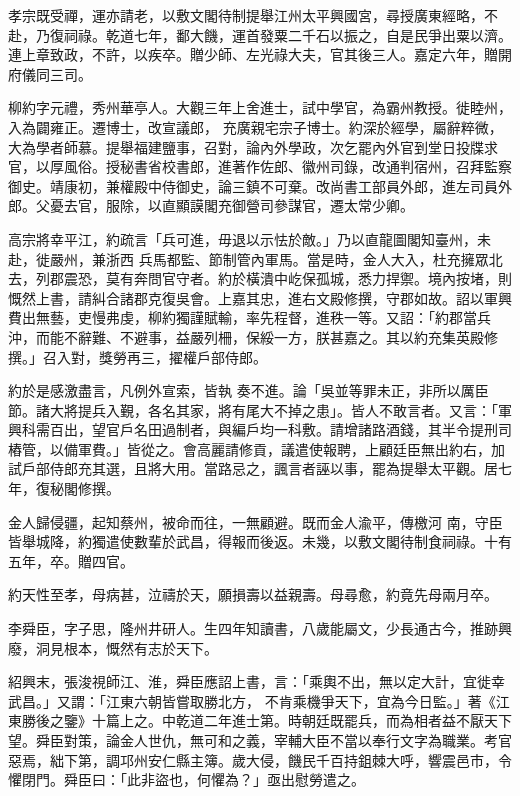 \begin{pinyinscope}
 孝宗既受禪，運亦請老，以敷文閣待制提舉江州太平興國宮，尋授廣東經略，不赴，乃復祠祿。乾道七年，鄱大饑，運首發粟二千石以振之，自是民爭出粟以濟。連上章致政，不許，以疾卒。贈少師、左光祿大夫，官其後三人。嘉定六年，贈開府儀同三司。



 柳約字元禮，秀州華亭人。大觀三年上舍進士，試中學官，為霸州教授。徙睦州，入為闢雍正。遷博士，改宣議郎，
 充廣親宅宗子博士。約深於經學，屬辭粹微，大為學者師慕。提舉福建鹽事，召對，論內外學政，次乞罷內外官到堂日投牒求官，以厚風俗。授秘書省校書郎，進著作佐郎、徽州司錄，改通判宿州，召拜監察御史。靖康初，兼權殿中侍御史，論三鎮不可棄。改尚書工部員外郎，進左司員外郎。父憂去官，服除，以直顯謨閣充御營司參謀官，遷太常少卿。



 高宗將幸平江，約疏言「兵可進，毋退以示怯於敵。」乃以直龍圖閣知臺州，未赴，徙嚴州，兼浙西
 兵馬都監、節制管內軍馬。當是時，金人大入，杜充擁眾北去，列郡震恐，莫有奔問官守者。約於橫潰中屹保孤城，悉力捍禦。境內按堵，則慨然上書，請糾合諸郡克復吳會。上嘉其忠，進右文殿修撰，守郡如故。詔以軍興費出無藝，吏慢弗虔，柳約獨謹賦輸，率先程督，進秩一等。又詔：「約郡當兵沖，而能不辭難、不避事，益嚴列柵，保綏一方，朕甚嘉之。其以約充集英殿修撰。」召入對，獎勞再三，擢權戶部侍郎。



 約於是感激盡言，凡例外宣索，皆執
 奏不進。論「吳並等罪未正，非所以厲臣節。諸大將提兵入覲，各名其家，將有尾大不掉之患」。皆人不敢言者。又言：「軍興科需百出，望官戶名田過制者，與編戶均一科敷。請增諸路酒錢，其半令提刑司樁管，以備軍費。」皆從之。會高麗請修貢，議遣使報聘，上顧廷臣無出約右，加試戶部侍郎充其選，且將大用。當路忌之，諷言者誣以事，罷為提舉太平觀。居七年，復秘閣修撰。



 金人歸侵疆，起知蔡州，被命而往，一無顧避。既而金人渝平，傳檄河
 南，守臣皆舉城降，約獨遣使數輩於武昌，得報而後返。未幾，以敷文閣待制食祠祿。十有五年，卒。贈四官。



 約天性至孝，母病甚，泣禱於天，願損壽以益親壽。母尋愈，約竟先母兩月卒。



 李舜臣，字子思，隆州井研人。生四年知讀書，八歲能屬文，少長通古今，推跡興廢，洞見根本，慨然有志於天下。



 紹興末，張浚視師江、淮，舜臣應詔上書，言：「乘輿不出，無以定大計，宜徙幸武昌。」又謂：「江東六朝皆嘗取勝北方，
 不肯乘機爭天下，宜為今日監。」著《江東勝後之鑒》十篇上之。中乾道二年進士第。時朝廷既罷兵，而為相者益不厭天下望。舜臣對策，論金人世仇，無可和之義，宰輔大臣不當以奉行文字為職業。考官惡焉，絀下第，調邛州安仁縣主簿。歲大侵，饑民千百持鉏棘大呼，響震邑市，令懼閉門。舜臣曰：「此非盜也，何懼為？」亟出慰勞遣之。




\end{pinyinscope}
